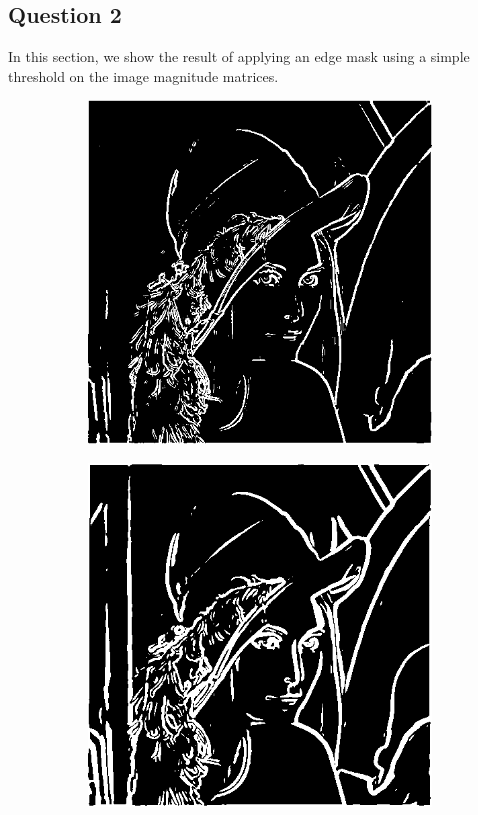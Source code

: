 \documentclass[a4paper]{article}
\begin{document}
\FloatBarrier

\subsection*{Question 2}

In this section, we show the result of applying an edge mask using a simple threshold on the image magnitude matrices.

\begin{figure}[h]

\begin{subfigure}{0.33\textwidth}
\includegraphics[width=\textwidth]{img/sigma1/lenast.png}
\end{subfigure}
\begin{subfigure}{0.33\textwidth}
\includegraphics[width=\textwidth]{img/sigma2/lenast.png}

\end{subfigure}
\end{figure}
\end{document}
